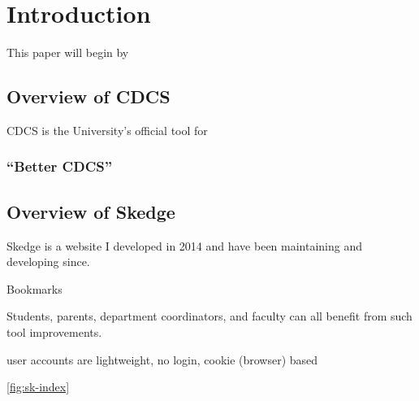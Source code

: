 
\chapter{Introduction}

This paper will begin by 

\section{Overview of CDCS}

CDCS is the University's official tool for 

\label{fig:cdcs-index}

\subsection{``Better CDCS''}


\section{Overview of Skedge}

Skedge is a website I developed in 2014 and have been maintaining and developing since.

Bookmarks

Students, parents, department coordinators, and faculty can all benefit from such tool improvements.

user accounts are lightweight, no login, cookie (browser) based

\ref{fig:sk-index}


